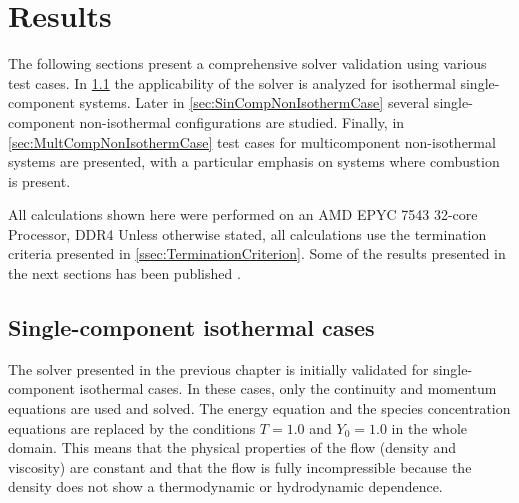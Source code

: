 \chapter{Results}	\label{ch:results}
\glsresetall
The following sections present a comprehensive solver validation using various test cases. In \cref{sec:SingleCompIsotCase} the applicability of the solver is analyzed for isothermal single-component systems. Later in \cref{sec:SinCompNonIsothermCase} several single-component non-isothermal configurations are studied. Finally, in \cref{sec:MultCompNonIsothermCase} test cases for multicomponent non-isothermal systems are presented, with a particular emphasis on systems where combustion is present.

All calculations shown here were performed on an AMD EPYC 7543 32-core Processor, DDR4 %
Unless otherwise stated, all calculations use the termination criteria presented in \cref{ssec:TerminationCriterion}.
Some of the results presented in the next sections has been published \citep{gutierrez-jorqueraFullyCoupledHighorder2022}.
\section{Single-component isothermal cases}\label{sec:SingleCompIsotCase}
The solver presented in the previous chapter is initially validated for single-component isothermal cases. In these cases, only the continuity and momentum equations are used and solved. The energy equation and the species concentration equations are replaced by the conditions $T = 1.0$ and $Y_0 = 1.0$ in the whole domain. This means that the physical properties of the flow (density and viscosity) are constant and that the flow is fully incompressible because the density does not show a thermodynamic or hydrodynamic dependence.


